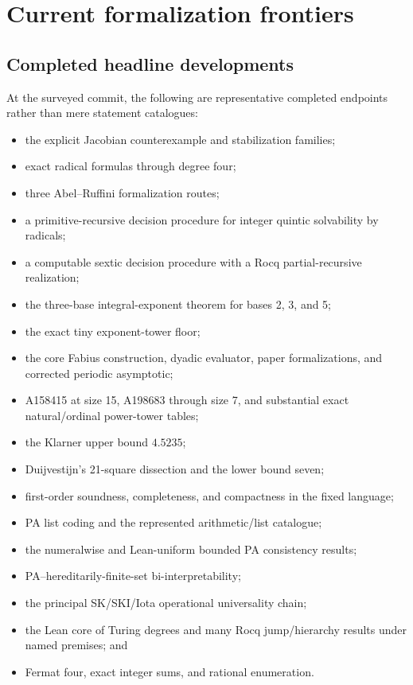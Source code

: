 \documentclass[
  10pt,
  a4paper,
  twoside,
  open=any,
  parskip=half,
  headings=big
]{scrreprt}
\begin{document}
\chapter{Current formalization frontiers}
\label{ch:frontiers}

\section{Completed headline developments}

At the surveyed commit, the following are representative completed endpoints rather than mere statement catalogues:

\begin{itemize}
  \item the explicit Jacobian counterexample and stabilization families;
  \item exact radical formulas through degree four;
  \item three Abel--Ruffini formalization routes;
  \item a primitive-recursive decision procedure for integer quintic solvability by radicals;
  \item a computable sextic decision procedure with a Rocq partial-recursive realization;
  \item the three-base integral-exponent theorem for bases 2, 3, and 5;
  \item the exact tiny exponent-tower floor;
  \item the core Fabius construction, dyadic evaluator, paper formalizations, and corrected periodic asymptotic;
  \item A158415 at size 15, A198683 through size 7, and substantial exact natural/ordinal power-tower tables;
  \item the Klarner upper bound $4.5235$;
  \item Duijvestijn's 21-square dissection and the lower bound seven;
  \item first-order soundness, completeness, and compactness in the fixed language;
  \item PA list coding and the represented arithmetic/list catalogue;
  \item the numeralwise and Lean-uniform bounded PA consistency results;
  \item PA--hereditarily-finite-set bi-interpretability;
  \item the principal SK/SKI/Iota operational universality chain;
  \item the Lean core of Turing degrees and many Rocq jump/hierarchy results under named premises; and
  \item Fermat four, exact integer sums, and rational enumeration.
\end{itemize}
\end{document}
